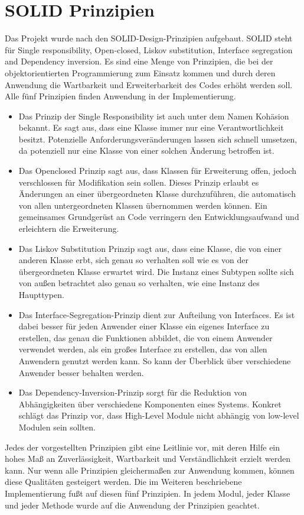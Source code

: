 \section{SOLID Prinzipien}

Das Projekt wurde nach den SOLID-Design-Prinzipien \cite{unclebob1995} aufgebaut. SOLID steht für Single responsibility, Open-closed, Liskov substitution, Interface segregation and Dependency inversion. Es sind  eine Menge von Prinzipien, die bei der objektorientierten Programmierung zum Einsatz kommen und durch deren Anwendung die Wartbarkeit und Erweiterbarkeit des Codes erhöht werden soll. Alle fünf Prinzipien finden Anwendung in der Implementierung.

\begin{itemize}
\item Das Prinzip der Single Responsibility  ist auch unter dem Namen Kohäsion bekannt. Es sagt aus, dass eine Klasse immer nur eine Verantwortlichkeit besitzt.  Potenzielle Anforderungsveränderungen lassen sich schnell umsetzen, da potenziell nur eine Klasse von einer solchen Änderung betroffen ist.

\item Das Open\/closed Prinzip sagt aus, dass Klassen für Erweiterung offen, jedoch verschlossen für Modifikation sein sollen. Dieses Prinzip erlaubt es Änderungen an einer übergeordneten Klasse durchzuführen, die automatisch von allen untergeordneten Klassen übernommen werden können. Ein gemeinsames Grundgerüst an Code verringern den Entwicklungsaufwand und erleichtern die Erweiterung.

\item Das Liskov Substitution Prinzip sagt aus, dass eine Klasse, die von einer anderen Klasse erbt, sich genau so verhalten soll wie es von der übergeordneten Klasse erwartet wird. Die Instanz eines Subtypen sollte sich von außen betrachtet also genau so verhalten, wie eine Instanz des Haupttypen.


\item Das Interface-Segregation-Prinzip dient zur Aufteilung von Interfaces. Es ist dabei besser für jeden Anwender einer Klasse ein eigenes Interface zu erstellen, das genau die Funktionen abbildet, die von einem Anwender verwendet werden, als ein großes Interface zu erstellen, das von allen Anwendern genutzt werden kann. So kann der Überblick über verschiedene Anwender besser behalten werden.

\item Das Dependency-Inversion-Prinzip sorgt für die Reduktion von Abhängigkeiten über verschiedene Komponenten eines Systems. Konkret schlägt das Prinzip vor, dass High-Level Module nicht abhängig von low-level Modulen sein sollten.
\end{itemize}

Jedes der vorgestellten Prinzipien gibt eine Leitlinie vor, mit deren Hilfe ein hohes Maß an Zuverlässigkeit, Wartbarkeit und Verständlichkeit erzielt werden kann. Nur wenn alle Prinzipien gleichermaßen zur Anwendung kommen, können diese Qualitäten gesteigert werden. Die im Weiteren beschriebene Implementierung fußt auf diesen fünf Prinzipien. In jedem Modul, jeder Klasse und jeder Methode wurde auf die Anwendung der Prinzipien geachtet.